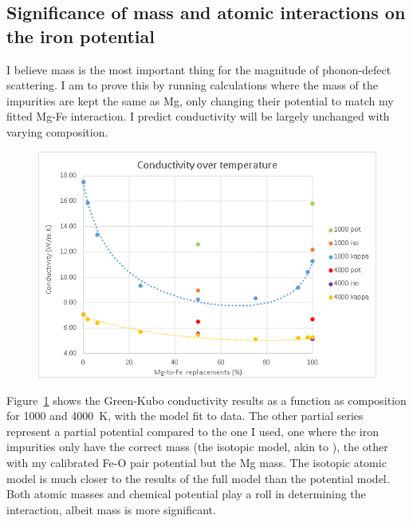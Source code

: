 \pagebreak

\subsection{\label{sec:iso_pot}Significance of mass and atomic interactions on the iron potential}

I believe mass is the most important thing for the magnitude of phonon-defect scattering. I am to prove this by running calculations where the mass of the impurities are kept the same as Mg, only changing their potential to match my fitted Mg-Fe interaction. I predict conductivity will be largely unchanged with varying composition.

\begin{figure}[h!]
  \includegraphics[width=\linewidth]{Figures/kc_iso_pot_full.png}
  \caption[kc iso pot full]{}
  \label{kc_iso_pot_full}
\end{figure}

Figure~\ref{kc_iso_pot_full} shows the Green-Kubo conductivity results as a function as composition for 1000 and 4000~K, with the model fit to data. The other partial series represent a partial potential compared to the one I used, one where the iron impurities only have the correct mass (the isotopic model, akin to \citet{Ammann2014}), the other with my calibrated Fe-O pair potential but the Mg mass. The isotopic atomic model is much closer to the results of the full model than the potential model. Both atomic masses and chemical potential play a roll in determining the interaction, albeit mass is more significant. 



\pagebreak

